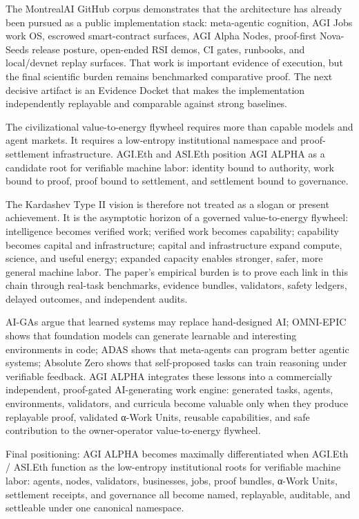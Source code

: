 \documentclass[
  11pt,
]{article}
\begin{document}
The MontrealAI GitHub corpus demonstrates that the architecture has
already been pursued as a public implementation stack: meta-agentic
cognition, AGI Jobs work OS, escrowed smart-contract surfaces, AGI Alpha
Nodes, proof-first Nova-Seeds release posture, open-ended RSI demos, CI
gates, runbooks, and local/devnet replay surfaces. That work is
important evidence of execution, but the final scientific burden remains
benchmarked comparative proof. The next decisive artifact is an Evidence
Docket that makes the implementation independently replayable and
comparable against strong baselines.

The civilizational value-to-energy flywheel requires more than capable
models and agent markets. It requires a low-entropy institutional
namespace and proof-settlement infrastructure. AGI.Eth and ASI.Eth
position AGI ALPHA as a candidate root for verifiable machine labor:
identity bound to authority, work bound to proof, proof bound to
settlement, and settlement bound to governance.

The Kardashev Type II vision is therefore not treated as a slogan or
present achievement. It is the asymptotic horizon of a governed
value-to-energy flywheel: intelligence becomes verified work; verified
work becomes capability; capability becomes capital and infrastructure;
capital and infrastructure expand compute, science, and useful energy;
expanded capacity enables stronger, safer, more general machine labor.
The paper's empirical burden is to prove each link in this chain through
real-task benchmarks, evidence bundles, validators, safety ledgers,
delayed outcomes, and independent audits.

AI-GAs argue that learned systems may replace hand-designed AI;
OMNI-EPIC shows that foundation models can generate learnable and
interesting environments in code; ADAS shows that meta-agents can
program better agentic systems; Absolute Zero shows that self-proposed
tasks can train reasoning under verifiable feedback. AGI ALPHA
integrates these lessons into a commercially independent, proof-gated
AI-generating work engine: generated tasks, agents, environments,
validators, and curricula become valuable only when they produce
replayable proof, validated α-Work Units, reusable capabilities, and
safe contribution to the owner-operator value-to-energy flywheel.

Final positioning: AGI ALPHA becomes maximally differentiated when
AGI.Eth / ASI.Eth function as the low-entropy institutional roots for
verifiable machine labor: agents, nodes, validators, businesses, jobs,
proof bundles, α-Work Units, settlement receipts, and governance all
become named, replayable, auditable, and settleable under one canonical
namespace.
\end{document}
